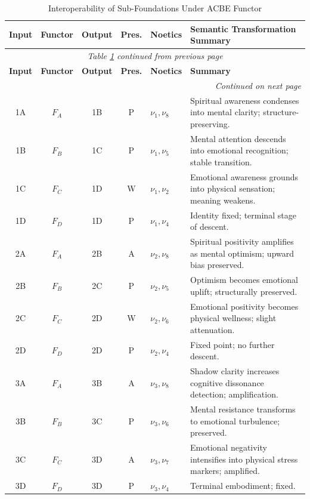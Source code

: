 \renewcommand{\arraystretch}{1.25}
\small
\begin{longtable}{c|c|c|c|p{1.5cm}|p{4.5cm}}
\caption{Interoperability of Sub-Foundations Under ACBE Functor}
\label{tab:subfoundation-acbe} \\
\toprule
\textbf{Input}
& \textbf{Functor}
& \textbf{Output}
& \textbf{Pres.}
& \textbf{Noetics}
& \textbf{Semantic Transformation Summary}
\\
\midrule
\endfirsthead
\multicolumn{6}{c}{\textit{Table \ref{tab:subfoundation-acbe} continued from previous page}} \\
\toprule
\textbf{Input}
& \textbf{Functor}
& \textbf{Output}
& \textbf{Pres.}
& \textbf{Noetics}
& \textbf{Summary}
\\
\midrule
\endhead
\midrule
\multicolumn{6}{r}{\textit{Continued on next page}} \\
\endfoot
\bottomrule
\endlastfoot

1A & $F_A$ & 1B & P &
$\nu_1,\nu_8$ &
Spiritual awareness condenses into mental clarity; structure-preserving.
\\
1B & $F_B$ & 1C & P &
$\nu_1,\nu_5$ &
Mental attention descends into emotional recognition; stable transition.
\\
1C & $F_C$ & 1D & W &
$\nu_1,\nu_2$ &
Emotional awareness grounds into physical sensation; meaning weakens.
\\
1D & $F_D$ & 1D & P &
$\nu_1,\nu_4$ &
Identity fixed; terminal stage of descent.
\\
\midrule

2A & $F_A$ & 2B & A &
$\nu_2,\nu_8$ &
Spiritual positivity amplifies as mental optimism; upward bias preserved.
\\
2B & $F_B$ & 2C & P &
$\nu_2,\nu_5$ &
Optimism becomes emotional uplift; structurally preserved.
\\
2C & $F_C$ & 2D & W &
$\nu_2,\nu_6$ &
Emotional positivity becomes physical wellness; slight attenuation.
\\
2D & $F_D$ & 2D & P &
$\nu_2,\nu_4$ &
Fixed point; no further descent.
\\
\midrule

3A & $F_A$ & 3B & A &
$\nu_3,\nu_8$ &
Shadow clarity increases cognitive dissonance detection; amplification.
\\
3B & $F_B$ & 3C & P &
$\nu_3,\nu_6$ &
Mental resistance transforms to emotional turbulence; preserved.
\\
3C & $F_C$ & 3D & A &
$\nu_3,\nu_7$ &
Emotional negativity intensifies into physical stress markers; amplified.
\\
3D & $F_D$ & 3D & P &
$\nu_3,\nu_4$ &
Terminal embodiment; fixed.
\\
\midrule


\end{longtable}

